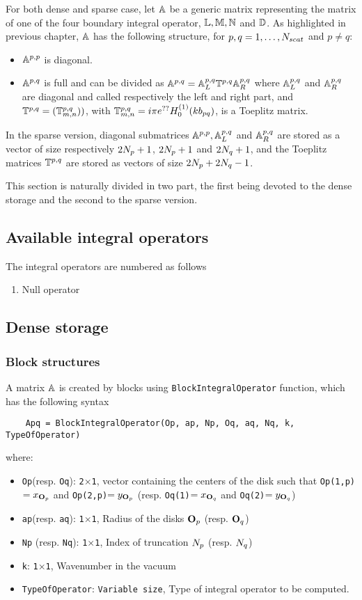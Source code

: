 For both dense and sparse case, let ${\mathbb{A}}$ be a generic matrix representing the matrix of one of the four boundary integral operator, ${\mathbb{L}},{\mathbb{M}},{\mathbb{N}}$ and ${\mathbb{D}}$. As highlighted in previous chapter, ${\mathbb{A}}$ has the following structure, for $p,q=1,\ldots,N_{scat}$ and $p\neq q$:
\begin{itemize}
\item $\mathbb{A}^{p,p}$ is diagonal.
\item $\mathbb{A}^{p,q}$ is full and can be divided as $\mathbb{A}^{p,q} = {\mathbb{A}}_L^{p,q}\mathbb{T}^{p,q}{\mathbb{A}}_R^{p,q}$ where ${\mathbb{A}}_L^{p,q}$ and ${\mathbb{A}}_R^{p,q}$ are diagonal and called respectively the left and right part, and $\mathbb{T}^{p,q} = (\mathbb{T}^{p,q}_{m,n}))$, with $\mathbb{T}^{p,q}_{m,n} = i\pi e^{??}H_0^{(1)}(kb_{pq})$, is a Toeplitz matrix.
\end{itemize}
In the sparse version, diagonal submatrices $\mathbb{A}^{p,p},{\mathbb{A}}_L^{p,q}$ and ${\mathbb{A}}_R^{p,q}$  are stored as a vector of size respectively $2N_{p}+1$, $2N_{p}+1$ and $2N_{q}+1$, and the Toeplitz matrices $\mathbb{T}^{p,q}$ are stored as vectors of size $2N_{p}+2N_{q}-1$.

This section is naturally divided in two part, the first being devoted to the dense storage and the second to the sparse version.

\subsection{Available integral operators}

The integral operators are numbered as follows
\begin{enumerate}
\item Null operator
\end{enumerate}


\subsection{Dense storage}
\subsubsection{Block structures}

A matrix ${\mathbb{A}}$ is created by blocks using \texttt{BlockIntegralOperator} function, which has the following syntax
\begin{verbatim}
	Apq = BlockIntegralOperator(Op, ap, Np, Oq, aq, Nq, k, TypeOfOperator)
\end{verbatim}
where:
\begin{itemize}
\item \texttt{Op}(resp. \texttt{Oq}): \texttt{2$\times$1}, vector containing the centers of the disk such that \texttt{Op(1,p)}$=x_{{\mathbf{O}}_p}$ and \texttt{Op(2,p)}$=y_{{\mathbf{O}}_p}$ (resp. \texttt{Oq(1)}$=x_{{\mathbf{O}}_q}$ and \texttt{Oq(2)}$=y_{{\mathbf{O}}_q}$)
\item \texttt{ap}(resp. \texttt{aq}): \texttt{1$\times$1}, Radius of the disks ${\mathbf{O}}_p$ (resp. ${\mathbf{O}}_q$)
\item \texttt{Np} (resp. \texttt{Nq}): \texttt{1$\times$1}, Index of truncation $N_{p}$ (resp. $N_{q}$)
\item \texttt{k}: \texttt{1$\times$1}, Wavenumber in the vacuum
\item \texttt{TypeOfOperator}: \texttt{Variable size}, Type of integral operator to be computed.
\end{itemize}

